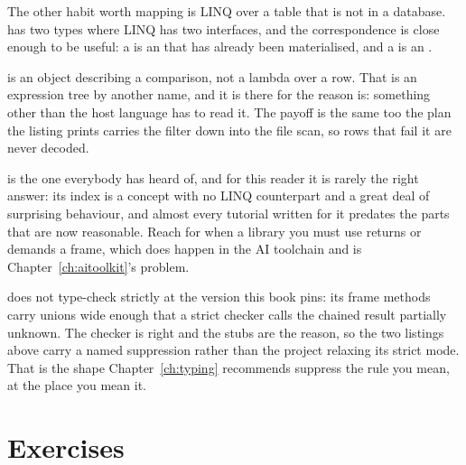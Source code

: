 The other habit worth mapping is LINQ over a table that is not in a
database.  has two types where LINQ has two interfaces, and the
correspondence is close enough to be useful: a  is an
 that has already been materialised, and a
 is an .




\noindent
{} is an object describing a comparison, not a
lambda over a row. That is an expression tree by another name, and it is
there for the reason  is: something other
than the host language has to read it. The payoff is the same too \dash{}
the plan the listing prints carries the filter down into the file scan, so
rows that fail it are never decoded.


\begin{note}
 is the one everybody has heard of, and for this reader it is
rarely the right answer: its index is a concept with no LINQ counterpart and
a great deal of surprising behaviour, and almost every tutorial written for
it predates the parts that are now reasonable. Reach for  when a
library you must use returns or demands a  frame, which does
happen in the AI toolchain and is Chapter~\ref{ch:aitoolkit}'s problem.
\end{note}

\begin{note}
 does not type-check strictly at the version this book pins: its
frame methods carry unions wide enough that a strict checker calls the
chained result partially unknown. The checker is right and the stubs are the
reason, so the two listings above carry a named suppression rather than the
project relaxing its strict mode. That is the shape
Chapter~\ref{ch:typing} recommends \dash{} suppress the rule you mean, at
the place you mean it.
\end{note}

\section*{Exercises}

